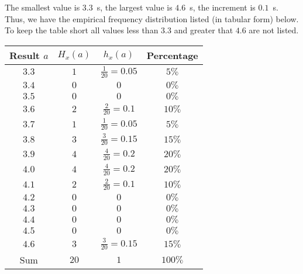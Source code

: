 \begin{MIntro}
\begin{MExample}
The smallest value is $3.3$~s, the largest value is $4.6$~s, the increment is $0.1$~s. Thus, we have the 
empirical frequency distribution listed (in tabular form) below. To keep the table short all values 
less than $3.3$ and greater that $4.6$ are not listed.
\begin{center}
\begin{tabular}{|c|c|c|c|}
\hline
Result $a$ & $H_{x}(a)$ & $h_{x}(a)$ & Percentage \\ \hline
$3.3$ & $1$ & $\frac{1}{20}=0.05$ & $5\%$ \\
$3.4$ & $0$ & $0$ & $0\%$ \\
$3.5$ & $0$ & $0$ & $0\%$ \\
$3.6$ & $2$ & $\frac{2}{20}=0.1$ & $10\%$\\
$3.7$ & $1$ & $\frac{1}{20}=0.05$ & $5\%$\\
$3.8$ & $3$ & $\frac{3}{20}=0.15$ & $15\%$\\
$3.9$ & $4$ & $\frac{4}{20}=0.2$ & $20\%$ \\
$4.0$ & $4$ & $\frac{4}{20}=0.2$ & $20\%$ \\
$4.1$ & $2$ & $\frac{2}{20}=0.1$ & $10\%$\\
$4.2$ & $0$ & $0$ & $0\%$ \\
$4.3$ & $0$ & $0$ & $0\%$ \\
$4.4$ & $0$ & $0$ & $0\%$ \\
$4.5$ & $0$ & $0$ & $0\%$\\
$4.6$ & $3$ & $\frac{3}{20}=0.15$ & $15\%$\\ \hline
Sum & $20$ & $1$ & $100\%$\\ \hline
\end{tabular}
\end{center}
\end{MExample}

\end{MIntro}

